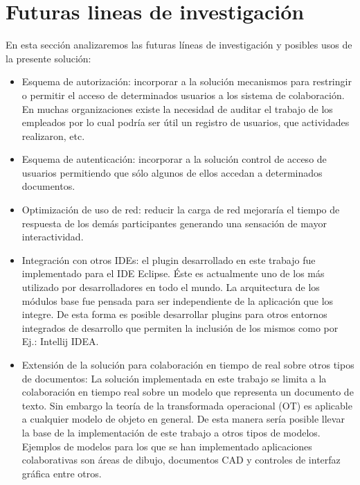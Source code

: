 \documentclass[12pt,a4paper]{article}
\begin{document}
\section{Futuras lineas de investigación}

En esta sección analizaremos las futuras líneas de investigación y posibles usos de la presente solución:

\begin{itemize}
	\item Esquema de autorización: incorporar a la solución mecanismos para restringir o permitir el acceso de determinados
		usuarios a los sistema de colaboración. En muchas organizaciones existe la necesidad de auditar el trabajo de los empleados 
		por lo cual podría ser útil un registro de usuarios, que actividades realizaron, etc.

	\item Esquema de autenticación: incorporar a la solución control de acceso de usuarios permitiendo que sólo algunos
		de ellos accedan a determinados documentos.

	\item Optimización de uso de red: reducir la carga de red mejoraría el tiempo de respuesta de los demás participantes
		generando una sensación de mayor interactividad.

	\item Integración con otros IDEs: el plugin desarrollado en este trabajo fue implementado para el IDE Eclipse. Éste es
		actualmente uno de los más utilizado por desarrolladores en todo el mundo. La arquitectura de los módulos base fue pensada 
		para ser independiente de la aplicación que los integre. De esta forma es posible desarrollar plugins para otros entornos
		integrados de desarrollo que permiten la inclusión de los mismos como por Ej.: Intellij IDEA.

	\item Extensión de la solución para colaboración en tiempo de real sobre otros tipos de documentos:
		La solución implementada en este trabajo se limita a la colaboración en tiempo real sobre un modelo que representa un
		documento de texto. Sin embargo la teoría de la transformada operacional (OT) es aplicable a cualquier modelo de objeto en
		general. De esta manera sería posible llevar la base de la implementación de este trabajo a otros tipos de modelos. Ejemplos
		de modelos para los que se han implementado aplicaciones colaborativas son áreas de dibujo, documentos CAD y controles de
		interfaz gráfica entre otros.


\end{itemize}
\end{document}
